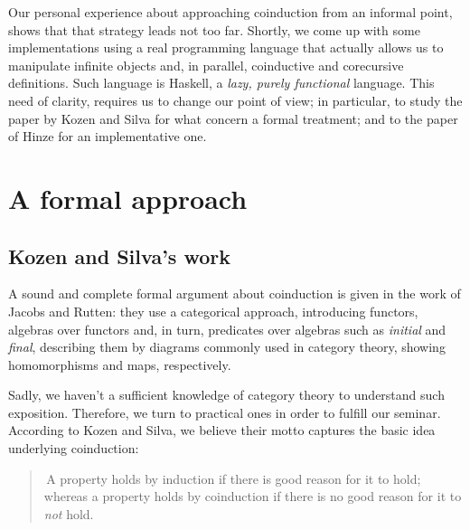 Our personal experience about approaching coinduction from an informal
point, shows that that strategy leads not too far. 
Shortly, we come up with some implementations
using a real programming language that actually allows us to manipulate
infinite objects and, in parallel, coinductive and corecursive definitions. 
Such language is Haskell, a \emph{lazy, purely functional} language.  
This need of clarity, requires us to change our point of view;
in particular, to study the paper by Kozen and Silva for what concern
a formal treatment; and to the paper of Hinze for an implementative one.

\section{A formal approach}

\subsection{Kozen and Silva's work}

A sound and complete formal argument about coinduction is given in the
work of Jacobs and Rutten: they use a categorical approach, introducing
functors, algebras over functors and, in turn, predicates over algebras 
such as \emph{initial} and \emph{final}, describing them by diagrams 
commonly used in category theory, showing homomorphisms and maps, 
respectively.

Sadly, we haven't a sufficient knowledge of category theory to understand
such exposition. Therefore, we turn to practical ones in order to fulfill
our seminar. According to Kozen and Silva, we believe their motto captures
the basic idea underlying coinduction:
\begin{quote}
    \guillemotleft\,A property holds by induction if there is good reason for
    it to hold; whereas a property holds by coinduction if there is no good
    reason for it to \emph{not} hold.\guillemotright
\end{quote}

